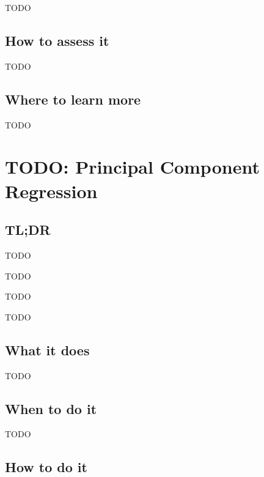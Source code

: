 \documentclass[
]{book}
\providecommand{\tightlist}{%
  \setlength{\itemsep}{0pt}\setlength{\parskip}{0pt}}
\begin{document}
TODO

\hypertarget{how-to-assess-it-13}{%
\section{How to assess it}\label{how-to-assess-it-13}}

TODO

\hypertarget{where-to-learn-more-13}{%
\section{Where to learn more}\label{where-to-learn-more-13}}

TODO

\hypertarget{principal-component-regression}{%
\chapter{TODO: Principal Component Regression}\label{principal-component-regression}}

\hypertarget{tldr-14}{%
\section{TL;DR}\label{tldr-14}}

\begin{description}
\tightlist
\item[What it does]
TODO
\item[When to do it]
TODO
\item[How to do it]
TODO
\item[How to assess it]
TODO
\end{description}

\hypertarget{what-it-does-14}{%
\section{What it does}\label{what-it-does-14}}

TODO

\hypertarget{when-to-do-it-14}{%
\section{When to do it}\label{when-to-do-it-14}}

TODO

\hypertarget{how-to-do-it-14}{%
\section{How to do it}\label{how-to-do-it-14}}
\end{document}
